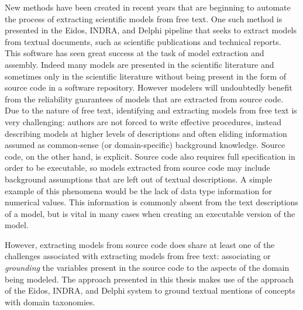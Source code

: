 New methods have been created in recent years that are beginning to automate the process of extracting scientific models from free text.
One such method is presented in the Eidos, INDRA, and Delphi \citep{EidosIndraDelphi} pipeline that seeks to extract models from textual documents, such as scientific publications and technical reports.
This software has seen great success at the task of model extraction and assembly.
Indeed many models are presented in the scientific literature and sometimes only in the scientific literature without being present in the form of source code in a software repository.
However modelers will undoubtedly benefit from the reliability guarantees of models that are extracted from source code.
Due to the nature of free text, identifying and extracting models from free text is very challenging: authors are not forced to write effective procedures, instead describing models at higher levels of descriptions and often eliding information assumed as common-sense (or domain-specific) background knowledge.
Source code, on the other hand, is explicit.
Source code also requires full specification in order to be executable, so models extracted from source code may include background assumptions that are left out of textual descriptions.
A simple example of this phenomena would be the lack of data type information for numerical values. This information is commonly absent from the text descriptions of a model, but is vital in many cases when creating an executable version of the model.

However, extracting models from source code does share at least one of the challenges associated with extracting models from free text:
associating or \emph{grounding} the variables present in the source code to the aspects of the domain being modeled.
The approach presented in this thesis makes use of the approach of the Eidos, INDRA, and Delphi system to ground textual mentions of concepts with domain taxonomies.

